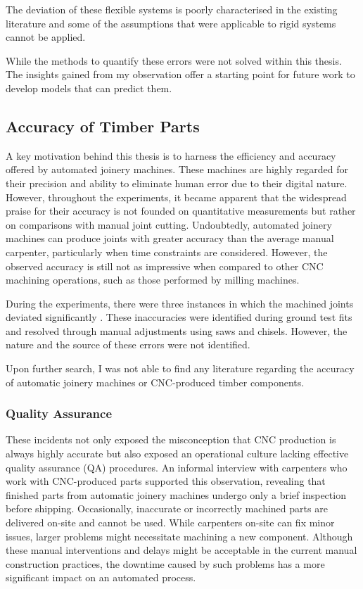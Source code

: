 The deviation of these flexible systems is poorly characterised in the existing literature and some of the assumptions that were applicable to rigid systems cannot be applied. 

While the methods to quantify these errors were not solved within this thesis. The insights gained from my observation offer a starting point for future work to develop models that can predict them. 

\subsection{Accuracy of Timber Parts}
\label{subsection:new-hypo-accuracy-of-timber-parts}

A key motivation behind this thesis is to harness the efficiency and accuracy offered by automated joinery machines. These machines are highly regarded for their precision and ability to eliminate human error due to their digital nature. However, throughout the experiments, it became apparent that the widespread praise for their accuracy is not founded on quantitative measurements but rather on comparisons with manual joint cutting. Undoubtedly, automated joinery machines can produce joints with greater accuracy than the average manual carpenter, particularly when time constraints are considered. However, the observed accuracy is still not as impressive when compared to other CNC machining operations, such as those performed by milling machines.

During the experiments, there were three instances in which the machined joints deviated significantly . These inaccuracies were identified during ground test fits and resolved through manual adjustments using saws and chisels. However, the nature and the source of these errors were not identified. 

Upon further search, I was not able to find any literature regarding the accuracy of automatic joinery machines or CNC-produced timber components.

\subsubsection{Quality Assurance}
\label{subsubsection:new-hypo-quality-assurance}

These incidents not only exposed the misconception that CNC production is always highly accurate but also exposed an operational culture lacking effective quality assurance (QA) procedures. An informal interview with carpenters who work with CNC-produced parts supported this observation, revealing that finished parts from automatic joinery machines undergo only a brief inspection before shipping. Occasionally, inaccurate or incorrectly machined parts are delivered on-site and cannot be used. While carpenters on-site can fix minor issues, larger problems might necessitate machining a new component. Although these manual interventions and delays might be acceptable in the current manual construction practices, the downtime caused by such problems has a more significant impact on an automated process.


